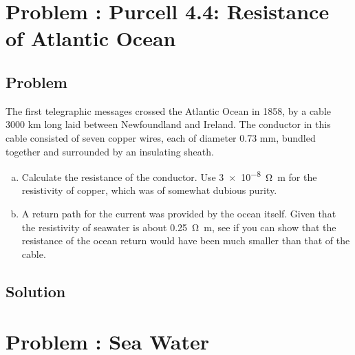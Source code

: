 \documentclass[solutions]{esg8022pset}
\date{\today }
\begin{document}
\section{Problem \thesection: Purcell 4.4: Resistance of Atlantic Ocean}
\subsection{Problem}
  The first telegraphic messages crossed the Atlantic Ocean in 1858, by a cable 3000 km long laid between Newfoundland and Ireland. The conductor in this cable consisted of seven copper wires, each of diameter 0.73 mm, bundled together and surrounded by an insulating sheath.
  \begin{enumerate}[(a)]
    \item Calculate the resistance of the conductor. Use \SI{3e-8}{\ohm\meter} for the resistivity of copper, which was of somewhat dubious purity.
    \item A return path for the current was provided by the ocean itself. Given that the resistivity of seawater is about \SI{0.25}{\ohm\meter}, see if you can show that the resistance of the ocean return would have been much smaller than that of the cable.
  \end{enumerate}
\subsection{Solution}

\section{Problem \thesection: Sea Water}
\end{document}
